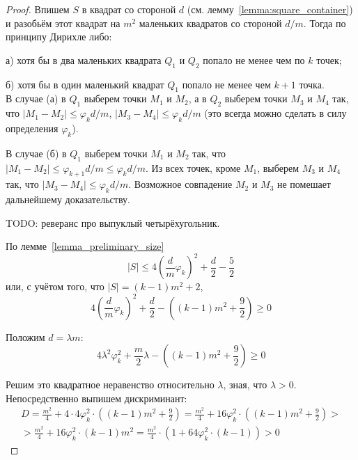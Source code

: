 \begin{proof}
	Впишем $S$ в квадрат со стороной $d$ (см. лемму~\ref{lemma:square_container})
	и разобьём этот квадрат на $m^2$ маленьких квадратов со стороной $d/m$.
	Тогда по принципу Дирихле либо:

	а) хотя бы в два маленьких квадрата $Q_1$ и $Q_2$ попало не менее чем по $k$ точек;

	б) хотя бы в один маленький квадрат $Q_1$ попало не менее чем $k+1$ точка.
	\\
	В случае (а) в $Q_1$ выберем точки $M_1$ и $M_2$,
	а в $Q_2$ выберем точки $M_3$ и $M_4$
	так, что $|M_1 - M_2| \leq \varphi_k d /m$, $|M_3 - M_4| \leq \varphi_k d/m$
	(это всегда можно сделать в силу определения $\varphi_k$).

	В случае (б) в $Q_1$ выберем точки $M_1$ и $M_2$ так, что
	$|M_1 - M_2| \leq \varphi_{k+1} d /m \leq \varphi_k d /m$.
	Из всех точек, кроме $M_1$, выберем $M_3$ и $M_4$ так, что
	$|M_3 - M_4| \leq \varphi_k d/m$.
	Возможное совпадение $M_2$ и $M_3$ не помешает дальнейшему доказательству.

	TODO: реверанс про выпуклый четырёхугольник.

	По лемме~\ref{lemma_preliminary_size}
	\begin{equation}
		|S| \leq 4 \left( \frac{d}{m} \varphi_k \right)^2 + \frac{d}{2} - \frac{5}{2}
	\end{equation}
	или, с учётом того, что $ |S| = (k-1)m^2 + 2$,
	\begin{equation}
		 4 \left( \frac{d}{m} \varphi_k \right)^2 + \frac{d}{2} - \left( (k-1)m^2 + \frac{9}{2}\right) \geq 0
	\end{equation}

	Положим $d = \lambda m$:
	\begin{equation}
		 4 \lambda^2 \varphi_k^2 + \frac{m}{2} \lambda - \left( (k-1)m^2 + \frac{9}{2}\right) \geq 0
	\end{equation}

	Решим это квадратное неравенство относительно $\lambda$,
	зная, что $\lambda > 0$.
	Непосредственно выпишем дискриминант:
	\begin{multline}
		D =
		\frac{m^2}{4} + 4 \cdot 4 \varphi_k^2 \cdot \left( (k-1)m^2 + \frac{9}{2}\right)
		=
		\frac{m^2}{4} + 16 \varphi_k^2 \cdot \left( (k-1)m^2 + \frac{9}{2}\right)
		>\\>
		\frac{m^2}{4} + 16 \varphi_k^2 \cdot (k-1)m^2
		=
		\frac{m^2}{4} \cdot (1 + 64 \varphi_k^2 \cdot (k-1))
		> 0
	\end{multline}


\end{proof}
